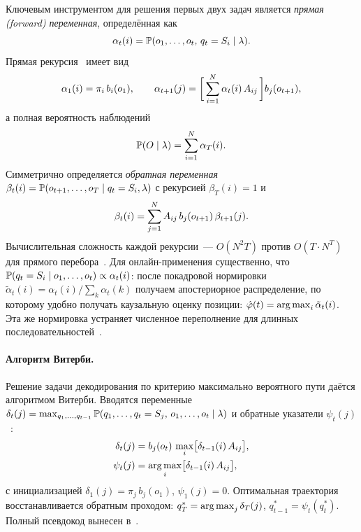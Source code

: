 Ключевым инструментом для решения первых двух задач является
\textit{прямая (forward) переменная}, определённая
как~\cite[уравн.~18]{Rabiner1989}
\begin{equation}
\alpha_t(i) = \Prb(o_1,\dots,o_t,\,q_t = S_i \mid \lambda).
\eqlab{forward-def}
\end{equation}
Прямая рекурсия~\cite[уравн.~19--20]{Rabiner1989} имеет вид
\begin{equation}
\alpha_1(i) = \pi_i\,b_i(o_1), \qquad
\alpha_{t+1}(j) = \biggl[\,\sum_{i=1}^{N}\alpha_t(i)\,A_{ij}\,
                  \biggr] b_j(o_{t+1}),
\eqlab{forward-rec}
\end{equation}
а полная вероятность наблюдений~\cite[уравн.~21]{Rabiner1989}
\begin{equation}
\Prb(O\mid\lambda) = \sum_{i=1}^{N}\alpha_T(i).
\eqlab{forward-prob}
\end{equation}
Симметрично определяется \textit{обратная переменная}
$\beta_t(i)=\mathbb{P}(o_{t+1},\dots,o_T\mid q_t=S_i,\lambda)$ с
рекурсией $\beta_T(i)=1$ и
\begin{equation}
\beta_t(i) = \sum_{j=1}^{N} A_{ij}\,b_j(o_{t+1})\,\beta_{t+1}(j).
\eqlab{backward-rec}
\end{equation}
Вычислительная сложность каждой рекурсии~--- $O(N^2 T)$ против
$O(T\cdot N^T)$ для прямого перебора~\cite[стр.~262]{Rabiner1989}.
Для онлайн-применения существенно, что
$\mathbb{P}(q_t=S_i\mid o_1,\dots,o_t)\propto \alpha_t(i)$: после
покадровой нормировки
$\tilde\alpha_t(i) = \alpha_t(i)\bigl/\sum_k\alpha_t(k)$
получаем апостериорное распределение, по которому удобно
получать каузальную оценку позиции:
$\hat\varphi(t) = \operatorname*{arg\,max}_i \tilde\alpha_t(i)$. Эта же
нормировка устраняет численное переполнение для длинных
последовательностей~\cite[\S V-A]{Rabiner1989}.

\paragraph*{Алгоритм Витерби.} Решение задачи декодирования по
критерию максимально вероятного пути даётся алгоритмом Витерби.
Вводятся переменные $\delta_t(j)=\max_{q_1,\dots,q_{t-1}}
\mathbb{P}(q_1,\dots,q_t=S_j,\,o_1,\dots,o_t\mid\lambda)$ и обратные
указатели $\psi_t(j)$~\cite[уравн.~32--35]{Rabiner1989}:
\begin{align}
\delta_t(j) &= b_j(o_t)\,\max_{i}\bigl[\delta_{t-1}(i)\,A_{ij}\bigr],
\eqlab{viterbi-delta-main} \\
\psi_t(j)   &= \argmaxop_{i}\bigl[\delta_{t-1}(i)\,A_{ij}\bigr],
\eqlab{viterbi-psi-main}
\end{align}
с инициализацией $\delta_1(j)=\pi_j\,b_j(o_1)$, $\psi_1(j)=0$.
Оптимальная траектория восстанавливается обратным проходом:
$q_T^* = \operatorname*{arg\,max}_j\delta_T(j)$, $q_{t-1}^* = \psi_t(q_t^*)$.
Полный псевдокод вынесен в~.

